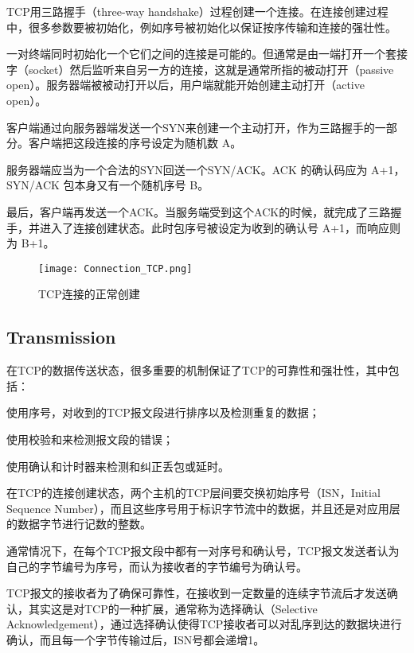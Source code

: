 TCP用三路握手（three-way handshake）过程创建一个连接。在连接创建过程中，很多参数要被初始化，例如序号被初始化以保证按序传输和连接的强壮性。

一对终端同时初始化一个它们之间的连接是可能的。但通常是由一端打开一个套接字（socket）然后监听来自另一方的连接，这就是通常所指的被动打开（passive open）。服务器端被被动打开以后，用户端就能开始创建主动打开（active open）。

\begin{compactenum}
\item 客户端通过向服务器端发送一个SYN来创建一个主动打开，作为三路握手的一部分。客户端把这段连接的序号设定为随机数 A。
\item 服务器端应当为一个合法的SYN回送一个SYN/ACK。ACK 的确认码应为 A+1，SYN/ACK 包本身又有一个随机序号 B。
\item 最后，客户端再发送一个ACK。当服务端受到这个ACK的时候，就完成了三路握手，并进入了连接创建状态。此时包序号被设定为收到的确认号 A+1，而响应则为 B+1。
\end{compactenum}

\begin{figure}[htbp]
\centering
\texttt{[image: Connection\_TCP.png]}
\caption{TCP连接的正常创建}
\end{figure}



\subsection{Transmission}

在TCP的数据传送状态，很多重要的机制保证了TCP的可靠性和强壮性，其中包括：

\begin{compactitem}
\item 使用序号，对收到的TCP报文段进行排序以及检测重复的数据；
\item 使用校验和来检测报文段的错误；
\item 使用确认和计时器来检测和纠正丢包或延时。
\end{compactitem}

在TCP的连接创建状态，两个主机的TCP层间要交换初始序号（ISN，Initial Sequence Number），而且这些序号用于标识字节流中的数据，并且还是对应用层的数据字节进行记数的整数。

通常情况下，在每个TCP报文段中都有一对序号和确认号，TCP报文发送者认为自己的字节编号为序号，而认为接收者的字节编号为确认号。

TCP报文的接收者为了确保可靠性，在接收到一定数量的连续字节流后才发送确认，其实这是对TCP的一种扩展，通常称为选择确认（Selective Acknowledgement），通过选择确认使得TCP接收者可以对乱序到达的数据块进行确认，而且每一个字节传输过后，ISN号都会递增1。


